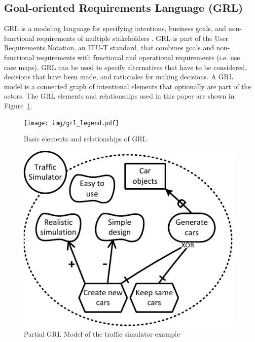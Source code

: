 \subsection{Goal-oriented Requirements Language (GRL)}
\label{sect:background:grl}
GRL is a modeling language for specifying intentions, business goals, and non-functional requirements of multiple stakeholders \cite{Amyot:2010:EGM:1841349.1841356}. GRL is part of the User Requirements Notation, an ITU-T standard, that combines goals and non-functional requirements with functional and operational requirements (i.e. use case maps). GRL can be used to specify alternatives that have to be considered, decisions that have been made, and rationales for making decisions. A GRL model is a connected graph of intentional elements that optionally are part of the actors. The GRL elements and relationships used in this paper are shown in Figure~\ref{fig:grl_legend}.

\begin{figure}[ht]
\centering
\texttt{[image: img/grl\_legend.pdf]}
\caption{Basic elements and relationships of GRL}
\label{fig:grl_legend}
\end{figure}


\begin{figure}[b]
\centering
\includegraphics[width=\columnwidth]{img/Example1.pdf}
\caption{Partial GRL Model of the traffic simulator example}
\label{fig:example-small}
\end{figure} 

